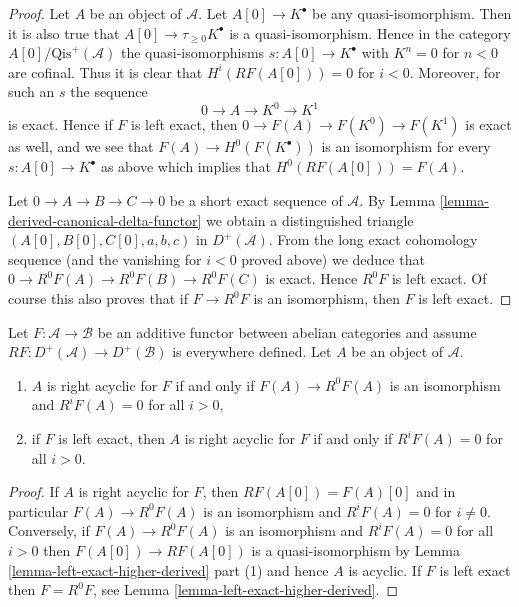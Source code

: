 \begin{proof}
Let $A$ be an object of $\mathcal{A}$. Let $A[0] \to K^\bullet$
be any quasi-isomorphism. Then it is also true that
$A[0] \to \tau_{\geq 0}K^\bullet$ is a quasi-isomorphism.
Hence in the category $A[0]/\text{Qis}^{+}(\mathcal{A})$ the
quasi-isomorphisms $s : A[0] \to K^\bullet$ with $K^n = 0$ for $n < 0$
are cofinal. Thus it is clear that $H^i(RF(A[0])) = 0$ for $i < 0$.
Moreover, for such an $s$ the sequence
$$
0 \to A \to K^0 \to K^1
$$
is exact. Hence if $F$ is left exact, then $0 \to F(A) \to F(K^0) \to F(K^1)$
is exact as well, and we see that $F(A) \to H^0(F(K^\bullet))$ is an
isomorphism for every $s : A[0] \to K^\bullet$ as above which implies
that $H^0(RF(A[0])) = F(A)$.

\medskip\noindent
Let $0 \to A \to B \to C \to 0$ be a short exact sequence of $\mathcal{A}$.
By
Lemma \ref{lemma-derived-canonical-delta-functor}
we obtain a distinguished triangle
$(A[0], B[0], C[0], a, b, c)$ in $D^{+}(\mathcal{A})$.
From the long exact cohomology sequence (and the vanishing for $i < 0$
proved above) we deduce that $0 \to R^0F(A) \to R^0F(B) \to R^0F(C)$
is exact. Hence $R^0F$ is left exact. Of course this also proves that if
$F \to R^0F$ is an isomorphism, then $F$ is left exact.
\end{proof}

\begin{lemma}
\label{lemma-F-acyclic}
Let $F : \mathcal{A} \to \mathcal{B}$ be an additive functor
between abelian categories and assume
$RF : D^{+}(\mathcal{A}) \to D^{+}(\mathcal{B})$ is everywhere
defined. Let $A$ be an object of $\mathcal{A}$.
\begin{enumerate}
\item $A$ is right acyclic for $F$ if and only if
$F(A) \to R^0F(A)$ is an isomorphism and $R^iF(A) = 0$ for all $i > 0$,
\item if $F$ is left exact, then $A$ is right acyclic for $F$
if and only if $R^iF(A) = 0$ for all $i > 0$.
\end{enumerate}
\end{lemma}

\begin{proof}
If $A$ is right acyclic for $F$, then $RF(A[0]) = F(A)[0]$ and in
particular $F(A) \to R^0F(A)$ is an isomorphism and
$R^iF(A) = 0$ for $i \not = 0$. Conversely, if $F(A) \to R^0F(A)$
is an isomorphism and $R^iF(A) = 0$ for all $i > 0$ then
$F(A[0]) \to RF(A[0])$ is a quasi-isomorphism by
Lemma \ref{lemma-left-exact-higher-derived} part (1)
and hence $A$ is acyclic. If $F$ is left exact then $F = R^0F$, see
Lemma \ref{lemma-left-exact-higher-derived}.
\end{proof}

